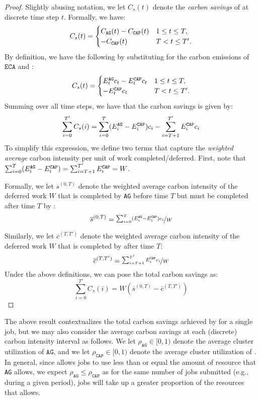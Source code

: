 \begin{proof}
Slightly abusing notation, we let $C_s(t)$ denote the \textit{carbon savings} of \CAP at discrete time step $t$.  Formally, we have:
\[
C_s(t) = \begin{cases}
    C_{\texttt{AG}}(t) - C_{\texttt{CAP}}(t) &  1 \leq t \leq T,\\
    - C_{\texttt{CAP}}(t) & T < t \leq T'.
\end{cases}
\]
By definition, we have the following by substituting for the carbon emissions of $\texttt{ECA}$ and \CAP:
\[
C_s(t) = \begin{cases}
    E^\texttt{AG}_t c_t  - E^\texttt{CAP}_t c_t &  1 \leq t \leq T,\\
    - E^\texttt{CAP}_t c_t& T < t \leq T'.
\end{cases}
\]
Summing over all time steps, we have that the carbon savings is given by:
\[
\sum_{i=0}^{T'} C_s(i) = \sum_{i=0}^{T} (E^\texttt{AG}_i-E^\texttt{CAP}_i) c_i - \sum_{i=T+1}^{T'} E^\texttt{CAP}_i c_i
\]
To simplify this expression, we define two terms that capture the \textit{weighted average} carbon intensity per unit of work completed/deferred.  First, note that $\sum_{i=0}^{T} (E^\texttt{AG}_i-E^\texttt{CAP}_i) = \sum_{i=T+1}^{T'} E^\texttt{CAP}_i = W$.

Formally, we let $\overline{s}^{(0,T)}$ denote the weighted average carbon intensity of the deferred work $W$ that is completed by \texttt{AG} before time $T$ but must be completed after time $T$ by \CAP:
\[
\overline{s}^{(0,T)} = \nicefrac{\sum_{i=0}^{T} (E^\texttt{AG}_i-E^\texttt{CAP}_i) c_i}{W}
\]

Similarly, we let $\overline{c}^{(T, T')}$ denote the weighted average carbon intensity of the deferred work $W$ that is completed by \CAP after time $T$:
\[
\overline{c}^{(T,T')} = \nicefrac{\sum_{i=T+1}^{T'} E^\texttt{CAP}_i c_i}{W}
\]
Under the above definitions, we can pose the total carbon savings as:
\[
\sum_{i=0}^{T'} C_s(i) = W \left( \overline{s}^{(0,T)} - \overline{c}^{(T,T')} \right)
\]
\end{proof}

The above result contextualizes the total carbon savings achieved by \CAP for a single job, but we may also consider the average carbon savings at each (discrete) carbon intensity interval as follows.
We let $\rho_{\texttt{AG}} \in [0,1)$ denote the average cluster utilization of $\texttt{AG}$, and we let $\rho_{\texttt{CAP}} \in [0,1)$ denote the average cluster  utilization of \CAP.  In general, since \CAP allows jobs to use less than or equal the amount of resource that \texttt{AG} allows, we expect $\rho_{\texttt{AG}} \leq \rho_{\texttt{CAP}}$ as for the same number of jobs submitted (e.g., during a given period), jobs will take up a greater proportion of the resources that \CAP allows. 



